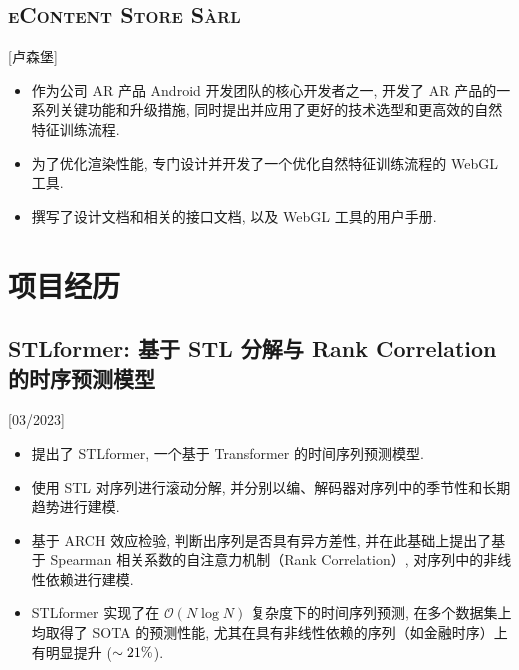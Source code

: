 \documentclass{mycv}
\begin{document}

\vspace{-\parskip}

\subsection{\large \scshape eContent Store S\`arl}[卢森堡]

\begin{positions}
\end{positions}

\begin{itemize}
  \itemsep 0.4em
  \item 作为公司 AR 产品 Android 开发团队的核心开发者之一, 开发了 AR 产品的一系列关键功能和升级措施, 同时提出并应用了更好的技术选型和更高效的自然特征训练流程.
  \item 为了优化渲染性能, 专门设计并开发了一个优化自然特征训练流程的 WebGL 工具.
  \item 撰写了设计文档和相关的接口文档, 以及 WebGL 工具的用户手册.
\end{itemize}

\section{项目经历}

\subsection{STLformer: 基于 STL 分解与 Rank Correlation 的时序预测模型}[03/2023]

\begin{itemize}
  \item 提出了 STLformer, 一个基于 Transformer 的时间序列预测模型.
  \item 使用 STL 对序列进行滚动分解, 并分别以编、解码器对序列中的季节性和长期趋势进行建模.
  \item 基于 ARCH 效应检验, 判断出序列是否具有异方差性, 并在此基础上提出了基于 Spearman 相关系数的自注意力机制（Rank Correlation）, 对序列中的非线性依赖进行建模.
  \item STLformer 实现了在 $\mathcal{O}(N \log{N})$ 复杂度下的时间序列预测, 在多个数据集上均取得了 SOTA 的预测性能, 尤其在具有非线性依赖的序列（如金融时序）上有明显提升 ($\thicksim 21\%$).
\end{itemize}
\end{document}
